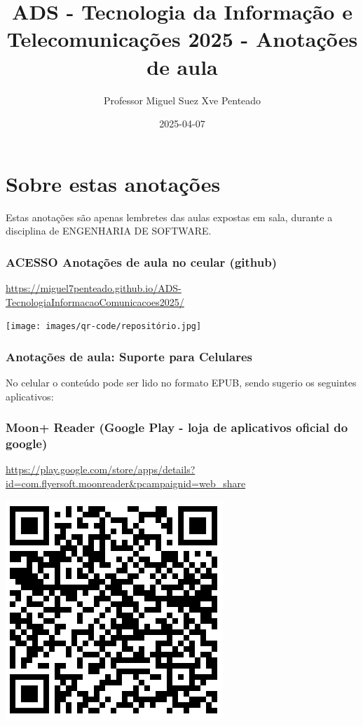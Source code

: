 \documentclass[
]{book}
\title{ADS - Tecnologia da Informação e Telecomunicações 2025 - Anotações de aula}
\author{Professor Miguel Suez Xve Penteado}
\date{2025-04-07}
\begin{document}
\maketitle

{
\setcounter{tocdepth}{1}
\tableofcontents
}
\chapter*{Sobre estas anotações}\label{sobre-estas-anotauxe7uxf5es}

Estas anotações são apenas lembretes das aulas expostas em sala, durante a disciplina de ENGENHARIA DE SOFTWARE.

\subsection{ACESSO Anotações de aula no ceular (github)}\label{acesso-anotauxe7uxf5es-de-aula-no-ceular-github}

\url{https://miguel7penteado.github.io/ADS-TecnologiaInformacaoComunicacoes2025/}

\texttt{[image: images/qr-code/repositório.jpg]}

\subsection{Anotações de aula: Suporte para Celulares}\label{anotauxe7uxf5es-de-aula-suporte-para-celulares}

No celular o conteúdo pode ser lido no formato EPUB, sendo sugerio os seguintes aplicativos:

\subsection{\texorpdfstring{\textbf{Moon+ Reader (Google Play - loja de aplicativos oficial do google)}}{Moon+ Reader (Google Play - loja de aplicativos oficial do google)}}\label{moon-reader-google-play---loja-de-aplicativos-oficial-do-google}

\url{https://play.google.com/store/apps/details?id=com.flyersoft.moonreader&pcampaignid=web_share}

\includegraphics{images/qr-code/leitor_ebook/MoonReaderPlus.jpg}
\end{document}
